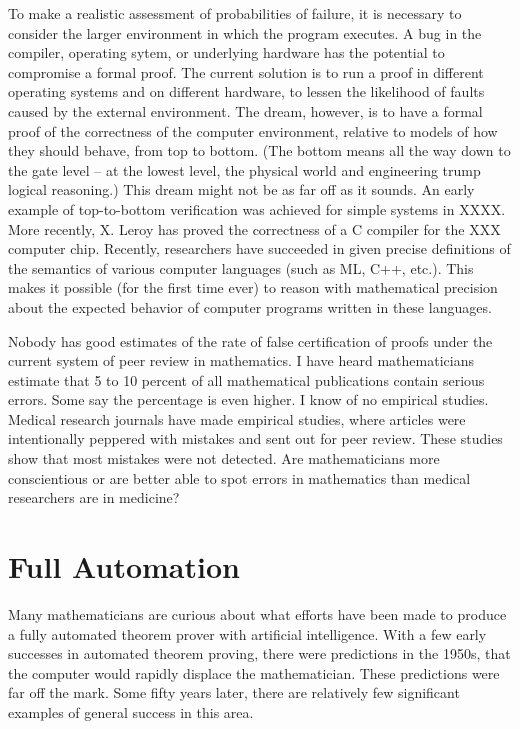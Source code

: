 \documentclass{llncs}
\begin{document}
To make a realistic assessment of probabilities of failure, it is necessary to consider the
larger environment in which the program executes.  A bug in the compiler, operating sytem,
or underlying hardware has the potential to compromise a formal proof.  The current solution
is to run a proof in different operating systems and on different hardware, to lessen
the likelihood of faults caused by the external environment.  The dream, however, is to have
a formal proof of the correctness of the computer environment, relative to models of how
they should behave, from top to bottom.  (The
bottom means all the way down to the gate level -- at the lowest level, 
the physical world and engineering trump logical reasoning.)  This dream might not be as far off
as it sounds.  An early example of top-to-bottom verification was achieved for simple
systems in XXXX.   More recently, X. Leroy has proved the correctness of a C compiler for the
XXX computer chip.  Recently, researchers have succeeded in given precise definitions of the
semantics of various computer languages (such as ML, C++, etc.).  This makes it possible (for the
first time ever) to reason with mathematical precision about the expected behavior of computer
programs written in these languages.

Nobody has good estimates of  the rate of false certification
of proofs  under the current system of peer review in mathematics.  I have heard mathematicians estimate that
5 to 10 percent of all mathematical publications contain serious errors.  Some say the percentage
is even higher.  I know of no empirical studies.
Medical research journals have made empirical studies, where
articles were intentionally peppered with mistakes and sent out for peer review.  These studies
show that most mistakes were
not detected. %
Are mathematicians more conscientious or are better able
to spot errors in mathematics than medical researchers are in medicine?




\section{Full Automation}

Many mathematicians are curious about what efforts have been made to
produce a fully automated theorem prover with artificial intelligence.
With a few early successes in automated theorem proving, 
there were predictions in the 1950s, that the computer would rapidly
displace the mathematician.  These predictions were far off the mark.
Some fifty years later, there are relatively few significant examples
of general success in this area.  
\end{document}
